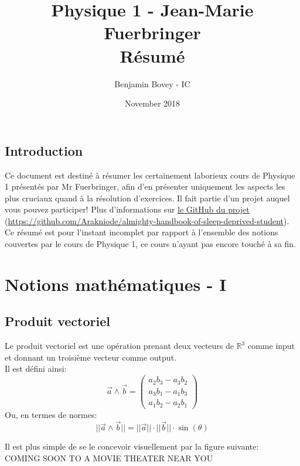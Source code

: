 \documentclass{article}
\title{\vspace{-1.5cm} Physique 1 - Jean-Marie Fuerbringer \\ Résumé}
\author{Benjamin Bovey - IC}
\date{November 2018}
\numberwithin{equation}{section}
\begin{document}
\maketitle

\subsection*{Introduction}
Ce document est destiné à résumer les certainement laborieux cours de Physique 1 présentés par Mr Fuerbringer, afin d'en présenter uniquement les aspects les plus cruciaux quand à la résolution d'exercices. Il fait partie d'un projet auquel vous pouvez participer! Plus d'informations sur \href{https://github.com/Arakniode/almighty-handbook-of-sleep-deprived-student}{le GitHub du projet} (\url{https://github.com/Arakniode/almighty-handbook-of-sleep-deprived-student}). \\
Ce résumé est pour l'instant incomplet par rapport à l'ensemble des notions couvertes par le cours de Physique 1, ce cours n'ayant pas encore touché à sa fin. 

\section{Notions mathématiques - I}

\subsection{Produit vectoriel}

Le produit vectoriel est une opération prenant deux vecteurs de \(\mathbb{R}^3\) comme input et donnant un troisième vecteur comme output. \\ %
Il est défini ainsi:
\begin{equation}
	\boxed {\vec a \wedge \vec b = \begin{pmatrix}a_2b_3 - a_3b_2 \\ a_3b_1 - a_1b_3 \\ a_1b_2 - a_2b_1\end{pmatrix} }
\end{equation}
Ou, en termes de normes:
\begin{equation}
	\boxed{ ||\vec a \wedge \vec b|| = ||\vec a|| \cdot ||\vec b|| \cdot \sin(\theta) }
\end{equation}

Il est plus simple de se le concevoir visuellement par la figure suivante: \\
	COMING SOON TO A MOVIE THEATER NEAR YOU \\
\end{document}
